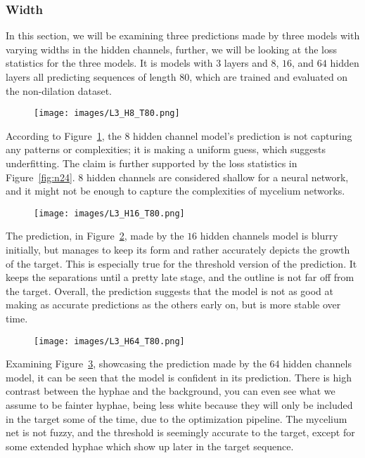 \documentclass[a4paper,12pt]{article}
\begin{document}
\subsubsection{Width}
In this section, we will be examining three predictions made by three models with varying widths in the hidden channels, further, we will be looking at the loss statistics for the three models. It is models with $3$ layers and $8$, $16$, and $64$ hidden layers all predicting sequences of length $80$, which are trained and evaluated on the non-dilation dataset.
\begin{figure}[H]
\centering
\texttt{[image: images/L3\_H8\_T80.png]}
\caption{} %
\label{fig:n21}
\end{figure}
According to Figure~\ref{fig:n21}, the $8$ hidden channel model’s prediction is not capturing any patterns or complexities; it is making a uniform guess, which suggests underfitting. The claim is further supported by the loss statistics in Figure~\ref{fig:n24}. $8$ hidden channels are considered shallow for a neural network, and it might not be enough to capture the complexities of mycelium networks.
\begin{figure}[H]
\centering
\texttt{[image: images/L3\_H16\_T80.png]}
\caption{} %
\label{fig:n22}
\end{figure}
The prediction, in Figure~\ref{fig:n22}, made by the $16$ hidden channels model is blurry initially, but manages to keep its form and rather accurately depicts the growth of the target. This is especially true for the threshold version of the prediction. It keeps the separations until a pretty late stage, and the outline is not far off from the target. Overall, the prediction suggests that the model is not as good at making as accurate predictions as the others early on, but is more stable over time.
\begin{figure}[H]
\centering
\texttt{[image: images/L3\_H64\_T80.png]}
\caption{} %
\label{fig:n23}
\end{figure}
Examining Figure~\ref{fig:n23}, showcasing the prediction made by the $64$ hidden channels model, it can be seen that the model is confident in its prediction. There is high contrast between the hyphae and the background, you can even see what we assume to be fainter hyphae, being less white because they will only be included in the target some of the time, due to the optimization pipeline. The mycelium net is not fuzzy, and the threshold is seemingly accurate to the target, except for some extended hyphae which show up later in the target sequence.
\end{document}
